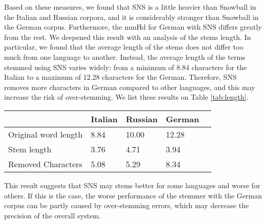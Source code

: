 Based on these measures, we found that SNS is a little heavier than Snowball in the Italian and Russian corpora, and it is considerably stronger than Snowball in the German corpus. Furthermore, the mmHd for German with SNS differs greatly from the rest. We deepened this result with an analysis of the stems length. In particular, we found that the average length of the stems does not differ too much from one language to another. Instead, the average length of the terms stemmed using SNS varies widely: from a minimum of 8.84 characters for the Italian to a maximum of 12.28 characters for the German. Therefore, SNS removes more characters in German compared to other languages, and this may increase the risk of over-stemming. We list these results on Table \ref{tab:length}.

\begin{center}
   \begin{tabular}{| l | l | l | l | l |}
    \hline
    & Italian & Russian & German\\ \hline
    Original word length & 8.84 & 10.00 & 12.28\\ \hline
    Stem length & 3.76 & 4.71 & 3.94\\ \hline   
    Removed Characters & 5.08 & 5.29 &  8.34\\ \hline
    \end{tabular}
    \label{tab:length}
\end{center}

This result suggests that SNS may stems better for some languages and worse for others. If this is the case, the worse performance of the stemmer with the German corpus can be partly caused by over-stemming errors, which may decrease the precision of the overall system.